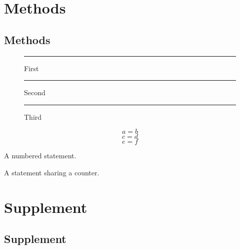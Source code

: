 
\ifdefined\WiseChapter\chapter{Methods}\label{chapter-target}\fi
\section{Methods}\label{section-target}
\begin{figure}[htbp]\centering\rule{20mm}{3mm}\caption{First}\label{a}\end{figure}
\begin{figure}[htbp]\centering\rule{20mm}{3mm}\caption{Second}\label{b}\end{figure}
\begin{figure}[htbp]\centering\rule{20mm}{3mm}\caption{Third}\label{c}\end{figure}
\begin{table}[htbp]\caption{Table}\label{t}\end{table}
\begin{equation}a=b\label{e}\end{equation}
\begin{equation}c=d\tag{S}\label{tagged}\end{equation}
\begin{equation}e=f\tag*{S}\label{bare}\end{equation}
\begin{theorem}\label{thm}A numbered statement.\end{theorem}
\begin{lemma}\label{lem}A statement sharing a counter.\end{lemma}
\appendix
\ifdefined\WiseChapter\chapter{Supplement}\else\section{Supplement}\fi
\label{app}
